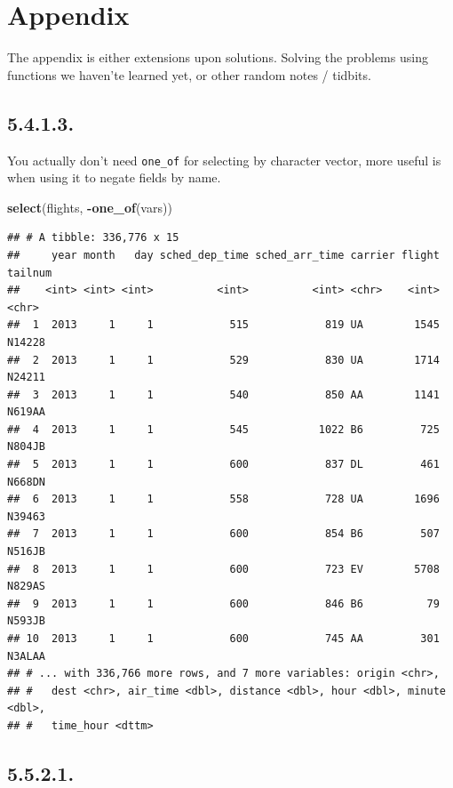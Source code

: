 \documentclass[]{book}
\newenvironment{Shaded}{\begin{snugshade}}{\end{snugshade}}
\newcommand{\KeywordTok}[1]{\textcolor[rgb]{0.13,0.29,0.53}{\textbf{#1}}}
\newcommand{\NormalTok}[1]{#1}
\newcommand{\OperatorTok}[1]{\textcolor[rgb]{0.81,0.36,0.00}{\textbf{#1}}}
\theoremstyle{definition}
\theoremstyle{definition}
\theoremstyle{definition}
\theoremstyle{remark}
\begin{document}
\hypertarget{appendix-1}{%
\chapter{Appendix}\label{appendix-1}}

The appendix is either extensions upon solutions. Solving the problems
using functions we haven'te learned yet, or other random notes /
tidbits.

\hypertarget{section-11}{%
\section{5.4.1.3.}\label{section-11}}

You actually don't need \texttt{one\_of} for selecting by character
vector, more useful is when using it to negate fields by name.

\begin{Shaded}
\begin{Highlighting}[]
\KeywordTok{select}\NormalTok{(flights, }\OperatorTok{-}\KeywordTok{one_of}\NormalTok{(vars))}
\end{Highlighting}
\end{Shaded}

\begin{verbatim}
## # A tibble: 336,776 x 15
##     year month   day sched_dep_time sched_arr_time carrier flight tailnum
##    <int> <int> <int>          <int>          <int> <chr>    <int> <chr>  
##  1  2013     1     1            515            819 UA        1545 N14228 
##  2  2013     1     1            529            830 UA        1714 N24211 
##  3  2013     1     1            540            850 AA        1141 N619AA 
##  4  2013     1     1            545           1022 B6         725 N804JB 
##  5  2013     1     1            600            837 DL         461 N668DN 
##  6  2013     1     1            558            728 UA        1696 N39463 
##  7  2013     1     1            600            854 B6         507 N516JB 
##  8  2013     1     1            600            723 EV        5708 N829AS 
##  9  2013     1     1            600            846 B6          79 N593JB 
## 10  2013     1     1            600            745 AA         301 N3ALAA 
## # ... with 336,766 more rows, and 7 more variables: origin <chr>,
## #   dest <chr>, air_time <dbl>, distance <dbl>, hour <dbl>, minute <dbl>,
## #   time_hour <dttm>
\end{verbatim}

\hypertarget{section-12}{%
\section{5.5.2.1.}\label{section-12}}
\end{document}
